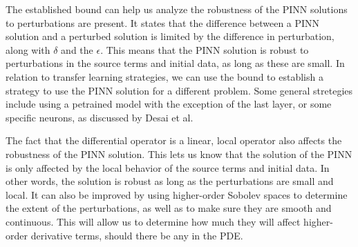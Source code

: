 \documentclass[unicode,11pt,a4paper,oneside,numbers=endperiod,openany]{scrartcl}
\begin{document}

The established bound can help us analyze the robustness of the PINN solutions
to perturbations are present.
It states that the difference between a PINN solution and a perturbed solution is limited by the difference in perturbation, along with $\delta$ and the $\epsilon$. 
This means that the PINN solution is robust to perturbations in the source
terms and initial data, as long as these are small. In relation to
transfer learning strategies, we can use the bound to establish a strategy to
use the PINN solution for a different problem. Some general stretegies include
using a petrained model with the exception of the last layer, or some specific
neurons, as discussed by Desai et al. \cite{bajaj2021recipes}

The fact that the differential operator is a linear, local operator also affects
the robustness of the PINN solution. This lets us know that the solution of the
PINN is only affected by the local behavior of the source terms and initial
data.
In other words, the solution is robust as long as the perturbations are small
and local. 
It can also be improved by using higher-order Sobolev spaces to determine the
extent of the perturbations, as well as to make sure they are smooth and
continuous. This will allow us to determine how much they will affect
higher-order derivative terms, should there be any in the PDE.
    


\end{document}
